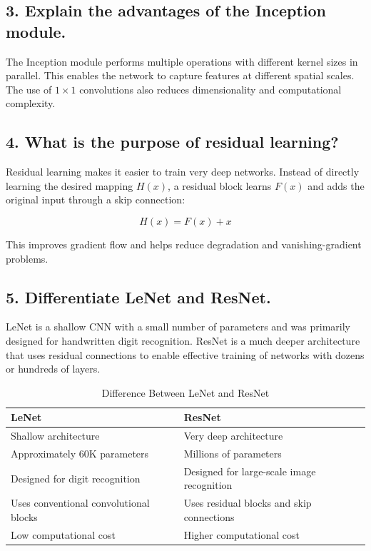 \documentclass[12pt,a4paper]{article}
\begin{document}
\subsection{3. Explain the advantages of the Inception module.}

The Inception module performs multiple operations with different kernel sizes in parallel. This enables the network to capture features at different spatial scales. The use of $1\times1$ convolutions also reduces dimensionality and computational complexity.

\subsection{4. What is the purpose of residual learning?}

Residual learning makes it easier to train very deep networks. Instead of directly learning the desired mapping $H(x)$, a residual block learns $F(x)$ and adds the original input through a skip connection:

\begin{equation}
H(x)=F(x)+x
\end{equation}

This improves gradient flow and helps reduce degradation and vanishing-gradient problems.

\subsection{5. Differentiate LeNet and ResNet.}

LeNet is a shallow CNN with a small number of parameters and was primarily designed for handwritten digit recognition. ResNet is a much deeper architecture that uses residual connections to enable effective training of networks with dozens or hundreds of layers.

\begin{table}[H]
\centering
\caption{Difference Between LeNet and ResNet}
\begin{tabular}{p{6cm}p{6cm}}
\toprule
\textbf{LeNet} & \textbf{ResNet} \\
\midrule
Shallow architecture & Very deep architecture \\
Approximately 60K parameters & Millions of parameters \\
Designed for digit recognition & Designed for large-scale image recognition \\
Uses conventional convolutional blocks & Uses residual blocks and skip connections \\
Low computational cost & Higher computational cost \\
\bottomrule
\end{tabular}
\end{table}
\end{document}
